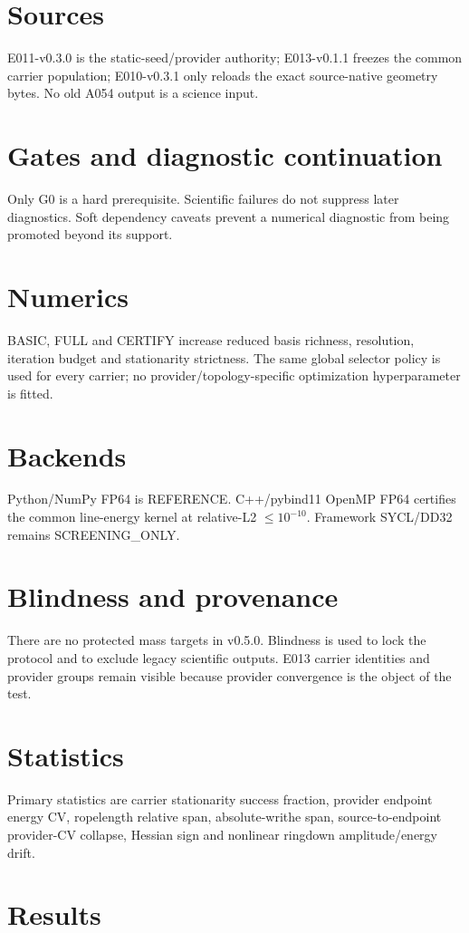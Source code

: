 \documentclass[11pt]{article}
\begin{document}
\section{Sources}
E011-v0.3.0 is the static-seed/provider authority; E013-v0.1.1 freezes the common carrier population; E010-v0.3.1 only reloads the exact source-native geometry bytes. No old A054 output is a science input.
\section{Gates and diagnostic continuation}
Only G0 is a hard prerequisite. Scientific failures do not suppress later diagnostics. Soft dependency caveats prevent a numerical diagnostic from being promoted beyond its support.
\section{Numerics}
BASIC, FULL and CERTIFY increase reduced basis richness, resolution, iteration budget and stationarity strictness. The same global selector policy is used for every carrier; no provider/topology-specific optimization hyperparameter is fitted.
\section{Backends}
Python/NumPy FP64 is REFERENCE. C++/pybind11 OpenMP FP64 certifies the common line-energy kernel at relative-L2 $\le10^{-10}$. Framework SYCL/DD32 remains SCREENING\_ONLY.
\section{Blindness and provenance}
There are no protected mass targets in v0.5.0. Blindness is used to lock the protocol and to exclude legacy scientific outputs. E013 carrier identities and provider groups remain visible because provider convergence is the object of the test.
\section{Statistics}
Primary statistics are carrier stationarity success fraction, provider endpoint energy CV, ropelength relative span, absolute-writhe span, source-to-endpoint provider-CV collapse, Hessian sign and nonlinear ringdown amplitude/energy drift.
\section{Results}
\end{document}
